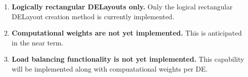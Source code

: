 

\begin{enumerate}

\item {\bf Logically rectangular DELayouts only.}
Only the logical rectangular DELayout creation method is currently implemented.

\item {\bf Computational weights are not yet implemented.}
This is anticipated in the near term.

\item {\bf Load balancing functionality is not yet implemented.}
This capability will be implemented along with compuatational weights per DE.

\end{enumerate}


